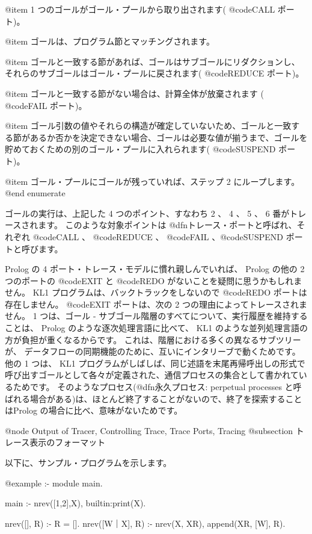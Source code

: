 {{{{@item
1 つのゴールがゴール・プールから取り出されます( @code{CALL} ポート)。

@item
ゴールは、プログラム節とマッチングされます。

@item
ゴールと一致する節があれば、ゴールはサブゴールにリダクションし、それらのサブゴールはゴール・プールに戻されます( @code{REDUCE} ポート)。

@item
ゴールと一致する節がない場合は、計算全体が放棄されます
( @code{FAIL} ポート)。

@item
ゴール引数の値やそれらの構造が確定していないため、ゴールと一致する節があるか否かを決定できない場合、ゴールは必要な値が揃うまで、ゴールを貯めておくための別のゴール・プールに入れられます( @code{SUSPEND} ポート)。

@item
ゴール・プールにゴールが残っていれば、ステップ 2 にループします。
@end enumerate

ゴールの実行は、上記した 4 つのポイント、すなわち 2 、 4 、 5 、 6 番がトレースされます。
このような対象ポイントは @dfn{トレース・ポート}と呼ばれ、それぞれ @code{CALL} 、 @code{REDUCE} 、 @code{FAIL} 、@code{SUSPEND} ポートと呼びます。

Prolog の 4 ポート・トレース・モデルに慣れ親しんでいれば、 Prolog の他の 2 つのポートの @code{EXIT} と @code{REDO} がないことを疑問に思うかもしれません。
 KL1 プログラムは、バックトラックをしないので @code{REDO} ポートは存在しません。
 @code{EXIT} ポートは、次の 2 つの理由によってトレースされません。
1 つは、ゴール - サブゴール階層のすべてについて、実行履歴を維持することは、 Prolog のような逐次処理言語に比べて、 KL1 のような並列処理言語の方が負担が重くなるからです。
これは、階層における多くの異なるサブツリーが、
データフローの同期機能のために、互いにインタリーブで動くためです。
他の 1 つは、 KL1 プログラムがしばしば、同じ述語を末尾再帰呼出しの形式で呼び出すゴールとして各々が定義された、通信プロセスの集合として書かれているためです。
そのようなプロセス(@dfn{永久プロセス}: perpetual processes と呼ばれる場合がある)は、ほとんど終了することがないので、終了を探索することはProlog の場合に比べ、意味がないためです。

@node Output of Tracer, Controlling Trace, Trace Ports, Tracing
@subsection トレース表示のフォーマット

以下に、サンプル・プログラムを示します。

@example
:- module main.

main :- nrev([1,2],X), builtin:print(X).

nrev([], R) :- R = [].
nrev([W｜X], R) :- nrev(X, XR), append(XR, [W], R).

}}}}
